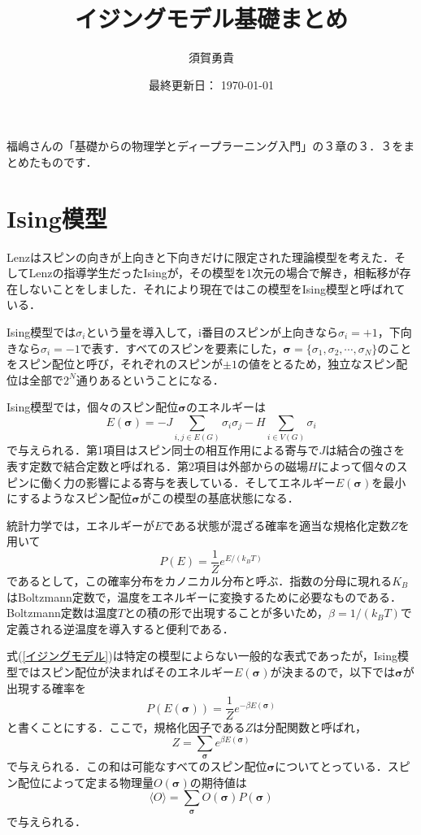 \documentclass[a4paper,11pt]{jsarticle}
\begin{document}
\title{イジングモデル基礎まとめ}
\author{須賀勇貴}
\date{最終更新日： \today}
\maketitle

福嶋さんの「基礎からの物理学とディープラーニング入門」の３章の３．３をまとめたものです．\par

\section*{Ising模型}
Lenzはスピンの向きが上向きと下向きだけに限定された理論模型を考えた．そしてLenzの指導学生だったIsingが，その模型を1次元の場合で解き，相転移が存在しないことをしました．それにより現在ではこの模型をIsing模型と呼ばれている．\par
Ising模型では$\sigma_i$という量を導入して，i番目のスピンが上向きなら$\sigma_i = +1$，下向きなら$\sigma_i = -1$で表す．すべてのスピンを要素にした，$\bm{\sigma}=\{ \sigma_1, \sigma_2, \cdots, \sigma_N \}$のことをスピン配位と呼び，それぞれのスピンが$\pm 1$の値をとるため，独立なスピン配位は全部で$2^N$通りあるということになる．\par
Ising模型では，個々のスピン配位$\bm{\sigma}$のエネルギーは
\begin{equation}
  E(\bm{\sigma}) = -J\sum_{i,j \in E(G)}\sigma_i \sigma_j -H \sum_{i \in V(G)} \sigma_i
\end{equation}
で与えられる．第1項目はスピン同士の相互作用による寄与で$J$は結合の強さを表す定数で結合定数と呼ばれる．第2項目は外部からの磁場$H$によって個々のスピンに働く力の影響による寄与を表している．そしてエネルギー$E(\bm{\sigma})$を最小にするようなスピン配位$\bm{\sigma}$がこの模型の基底状態になる．\par
統計力学では，エネルギーが$E$である状態が混ざる確率を適当な規格化定数$Z$を用いて
\begin{equation}
  P(E) = \frac{1}{Z}e^{E/(k_B T)} \label{イジングモデル}
\end{equation}
であるとして，この確率分布をカノニカル分布と呼ぶ．指数の分母に現れる$K_B$はBoltzmann定数で，温度をエネルギーに変換するために必要なものである．Boltzmann定数は温度$T$との積の形で出現することが多いため，$\beta = 1/(k_B T)$で定義される逆温度を導入すると便利である．\par
式(\ref{イジングモデル})は特定の模型によらない一般的な表式であったが，Ising模型ではスピン配位が決まればそのエネルギー$E(\bm{\sigma})$が決まるので，以下では$\bm{\sigma}$が出現する確率を
\begin{equation}
  P(E(\bm{\sigma})) = \frac{1}{Z}e^{-\beta E(\bm{\sigma})}
\end{equation}
と書くことにする．ここで，規格化因子である$Z$は分配関数と呼ばれ，
\begin{equation}
  Z = \sum_{\bm{\sigma}} e^{\beta E(\bm{\sigma})}
\end{equation}
で与えられる．この和は可能なすべてのスピン配位$\bm{\sigma}$についてとっている．スピン配位によって定まる物理量$O(\bm{\sigma})$の期待値は
\begin{equation}
  \langle O \rangle = \sum_{\bm{\sigma}}O(\bm{\sigma}) P(\bm{\sigma})
\end{equation}
で与えられる．\par
\end{document}
